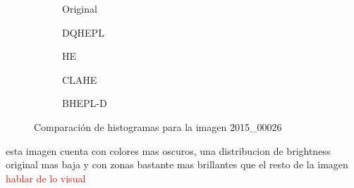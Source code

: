\documentclass[sigchi]{acmart}
\newcommand{\rojo}[1]{\textcolor{red}{#1}}
\begin{document}
\begin{figure}[htbp]
	\centering
	\begin{subfigure}[b]{0.45\textwidth}
		\resizebox{\linewidth}{!}{}
		\caption{Original}
		\label{fig:original_2}
	\end{subfigure}
	\hfill
	\begin{subfigure}[b]{0.45\textwidth}
		\resizebox{\linewidth}{!}{}
		\caption{DQHEPL}
		\label{fig:dqhepl_2}
	\end{subfigure}

	\begin{subfigure}[b]{0.45\textwidth}
		\resizebox{\linewidth}{!}{}
		\caption{HE}
		\label{fig:he_2}
	\end{subfigure}
	\hfill
	\begin{subfigure}[b]{0.45\textwidth}
		\resizebox{\linewidth}{!}{}
		\caption{CLAHE}
		\label{fig:clahe_2}
	\end{subfigure}

	\centering
	\begin{subfigure}[b]{0.45\textwidth}
		\resizebox{\linewidth}{!}{}
		\caption{BHEPL-D}
		\label{fig:bhepl_2}
	\end{subfigure}

	\caption{Comparación de histogramas para la imagen 2015\_00026}
	\label{fig:histogramas_2}
\end{figure}

esta imagen cuenta con colores mas oscuros, una distribucion de brightness original mas baja y
con zonas bastante mas brillantes que el resto de la imagen
\rojo{hablar de lo visual}
\end{document}
